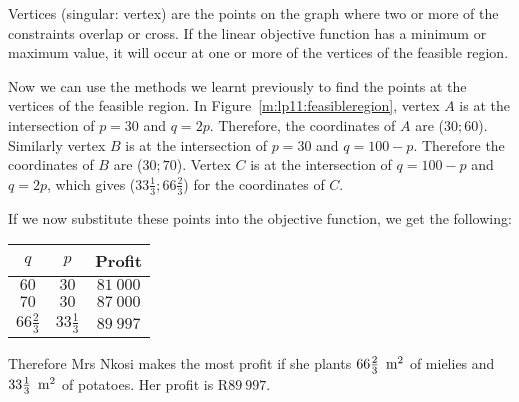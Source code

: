 Vertices (singular: vertex) are the points on the graph where two or more of the constraints overlap or cross. If the linear objective function has a minimum or maximum value, it will occur at one or more of the vertices of the feasible region.

Now we can use the methods we learnt previously to find the points at the vertices of the feasible region. In Figure~\ref{m:lp11:feasibleregion}, vertex $A$ is at the intersection of $p=30$ and $q=2p$. Therefore, the coordinates of $A$ are ($30;60$). Similarly vertex $B$ is at the intersection of $p=30$ and $q=100-p$. Therefore the coordinates of $B$ are ($30;70$). Vertex $C$ is at the intersection of $q=100-p$ and $q=2p$, which gives ($33\frac{1}{3};66\frac{2}{3}$) for the coordinates of $C$.

If we now substitute these points into the objective function, we get the following:
\begin{center}
\begin{tabular}{|c|c|c|}\hline
$q$&$p$&Profit\\\hline\hline
$60$&$30$&$81~000$\\\hline
$70$&$30$&$87~000$\\\hline
$66\frac{2}{3}$&$33\frac{1}{3}$&$89~997$\\\hline
\hline
\end{tabular}
\end{center}

Therefore Mrs Nkosi makes the most profit if she plants $66\frac{2}{3}~\,\rm{m}^2$ of mielies and $33\frac{1}{3}~\,\rm{m}^2$ of potatoes. Her profit is R$89~997$.

